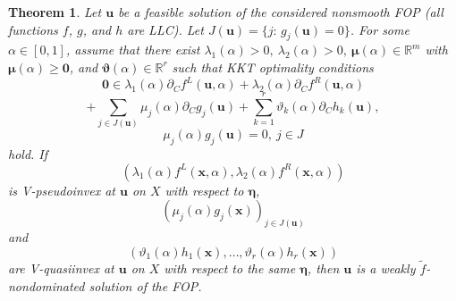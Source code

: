 \documentclass[10pt,a4paper]{amsart}
\newtheorem{theorem}{Theorem}
\begin{document}
\begin{theorem}\label{4.3.1} Let $\boldsymbol u$ be a feasible solution of the considered nonsmooth FOP (all functions $f$, $g$, and $h$ are LLC).
Let $J(\boldsymbol{u}) = \{j\!:\,g_j(\boldsymbol{u}) = 0\}$. For some $\alpha\in[0,1]$, assume that there exist $\lambda_1( \alpha) > 0,\  \lambda_2( \alpha) > 0,\  {\boldsymbol \mu}( \alpha) \in \mathbb  R^{m}$ with
${\boldsymbol\mu}(\alpha)\ge \boldsymbol 0$, and $ {\boldsymbol \vartheta}( \alpha) \in \mathbb R^r$ such that KKT optimality conditions
$$\boldsymbol 0 \in  \lambda_1( \alpha)\partial_Cf^L(\boldsymbol u,  \alpha) +  \lambda_2( \alpha)\partial_Cf^R(\boldsymbol u,  \alpha)$$
$$+ \sum_{j\in J(\boldsymbol{u})}  \mu_j( \alpha)\partial_Cg_j(\boldsymbol u) + \sum_{k=1}^r  \vartheta_k( \alpha)\partial_Ch_k(\boldsymbol u),$$
$$ \mu_j( \alpha)g_j(\boldsymbol u) = 0,\ j\in J$$
hold. If $$( \lambda_1( \alpha) f^L(\boldsymbol x,  \alpha),  \lambda_2( \alpha) f^R(\boldsymbol x,  \alpha))$$ is V-pseudoinvex at $\boldsymbol u$ on $X$ with respect to $\boldsymbol \eta$, 
$$( \mu_j( \alpha) g_j(\boldsymbol x))_{j \in J(\boldsymbol{u})}$$
and $$( \vartheta_1( \alpha) h_1(\boldsymbol x),\dots,  \vartheta_r( \alpha) h_r(\boldsymbol x))$$ are V-quasiinvex at $\boldsymbol u$ on $X$ with respect to the same $\boldsymbol \eta$, then $\boldsymbol u$ is a weakly $\tilde f$-nondominated solution of the FOP.
\end{theorem}
\end{document}
